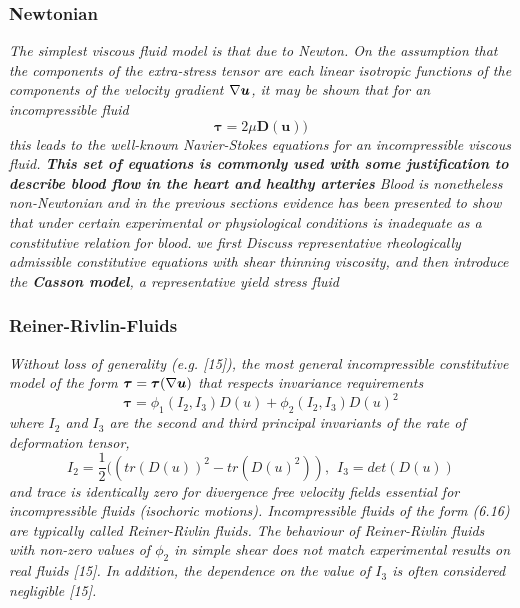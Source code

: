 \documentclass[11pt,letterpaper]{article}
\begin{document}
\subsubsection*{Newtonian}\textit{ The simplest viscous fluid model is that due to Newton. On the assumption that the components of the extra-stress tensor are each linear isotropic functions of the components of the velocity gradient $\nabla \bm{u} $, it may be shown that for an incompressible fluid
\begin{equation}
    \bm{\tau}= 2\mu \bm{D}(\bm{u}))
\end{equation}
this leads to the well-known Navier-Stokes equations for an incompressible viscous fluid. \textbf{This set of equations is commonly used with some justification to describe blood flow in the heart and healthy arteries} Blood is nonetheless non-Newtonian and in the previous sections evidence has been presented to show that under certain experimental or physiological conditions is inadequate as a constitutive relation for blood.}\newline\newline
\textit{ we first Discuss representative rheologically admissible constitutive equations with shear thinning viscosity, and then introduce the \textbf{Casson model}, a representative yield stress fluid}

\subsubsection*{Reiner-Rivlin-Fluids}
\textit{Without loss of generality (e.g. [15]), the most general incompressible constitutive model of the form $ \bm{\tau} = \bm{\tau}(\nabla \bm{u})$ that respects invariance requirements
\begin{equation}
    \bm{\tau }= \phi_1(I_2, I_3) D(u) + \phi_2(I_2,I_3)D(u)^2
\end{equation}
where $I_2$ and $I_3$ are the second and third principal invariants of the rate of deformation tensor,
\begin{equation}
    I_2= \frac{1}{2}((tr(D(u))^2-tr(D(u)^2)), \hspace{5pt}  I_3 = det(D(u))
\end{equation}
and trace is identically zero for divergence free velocity fields essential for incompressible fluids (isochoric motions). Incompressible fluids of the form (6.16) are typically called Reiner-Rivlin fluids. The behaviour of Reiner-Rivlin fluids with non-zero values of $\phi_2$ in simple shear does not match experimental results on real fluids [15]. In addition, the dependence on the value of $I_3$ is often considered negligible [15].
}
\end{document}

